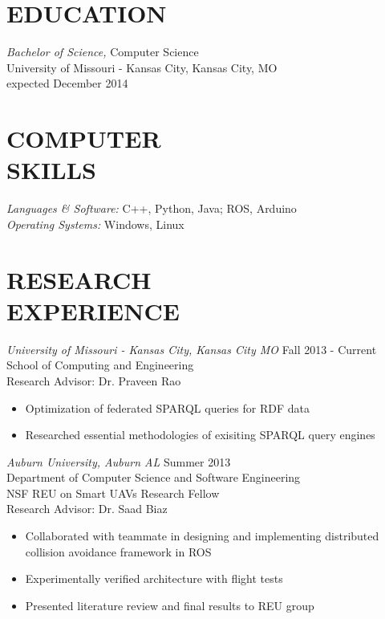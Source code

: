 \documentclass[line,margin]{res}
\begin{document}
\address{\hfill 11408 Colorado Ave \#12, Kansas City, MO 64137}
\address{\hfill (913)235-1070 \textbar \textbar \hspace{1 mm}  victoria.chen.wu@gmail.com}

 
\begin{resume}
 
\section{EDUCATION} {\sl Bachelor of Science,} Computer Science	\\
                University of Missouri - Kansas City, Kansas City, MO \\
                expected December 2014 
\section{COMPUTER \\ SKILLS} {\sl Languages \& Software:} 
		C++, Python, Java; ROS, Arduino \\
                {\sl Operating Systems:} Windows, Linux 
\section {RESEARCH \\ EXPERIENCE}
		{\sl University of Missouri - Kansas City, Kansas City MO} \hfill Fall 2013 - Current \\
		School of Computing and Engineering \\
		Research Advisor: Dr. Praveen Rao
		 \begin{itemize} [leftmargin=5mm]  \itemsep -2pt %
		 \item  Optimization of federated SPARQL queries for RDF data
		\item   Researched essential methodologies of exisiting SPARQL query engines 
		\end{itemize}


		{\sl Auburn University, Auburn AL}  \hfill  Summer 2013\\
		Department of Computer Science and Software Engineering  \\
		NSF REU on Smart UAVs Research Fellow \\
		Research Advisor: Dr. Saad Biaz
                 \begin{itemize}[leftmargin=5mm]  \itemsep -2pt %
		 \item Collaborated with teammate in designing and implementing distributed collision avoidance framework in ROS 
		 \item Experimentally verified architecture with flight tests 
		 \item Presented literature review and final results to REU group 
                 \end{itemize} 
  

\end{resume}
\end{document}
